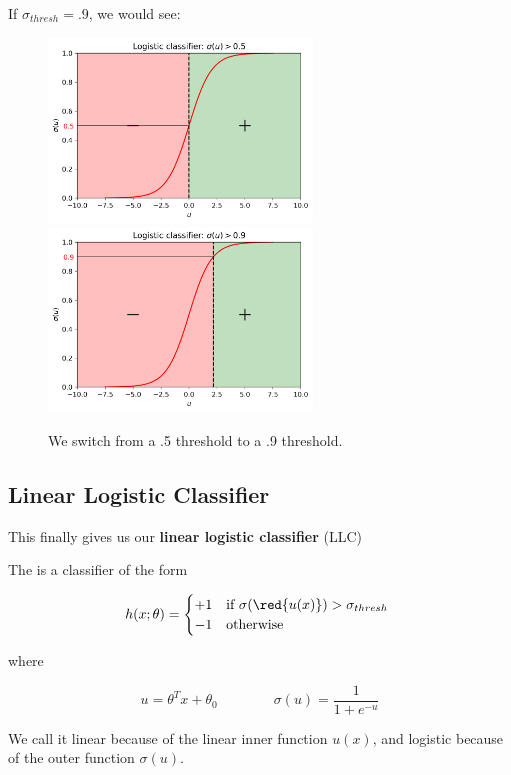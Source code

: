         \miniex If $\sigma_{thresh}=.9$, we would see:
        
        \begin{figure}[H]
            
            \includegraphics[width=70mm,scale=0.5]{images/classification_images/sigmoid_.5.png}
            \includegraphics[width=70mm,scale=0.5]{images/classification_images/sigmoid_.9.png}
            \caption*{We switch from a .5 threshold to a .9 threshold.}

        \end{figure}
        
    \subsection*{Linear Logistic Classifier}
        
        This finally gives us our \textbf{linear logistic classifier} (LLC)\\
        
        \begin{kequation}
            The  is a  classifier of the form
            
            \begin{equation*}
                h(x; \theta) = 
                \begin{cases}
                    +1 & \text{if $\sigma(\red{u(x)})>\sigma_{thresh}$ }\\
                    -1 & \text{otherwise}
                \end{cases}
            \end{equation*}
            
            where 
            
            \begin{equation}
                u=\theta^T x + \theta_0   \qquad\qquad \sigma(u) = \frac{1}{1+e^{-u}}
            \end{equation}
            
            We call it linear because of the linear inner function $u(x)$, and logistic because of the outer function $\sigma(u)$.
        \end{kequation}